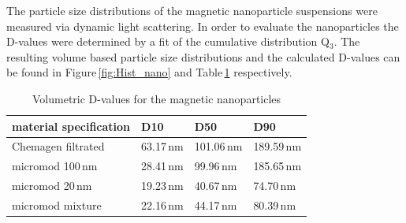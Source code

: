 The particle size distributions of the magnetic nanoparticle suspensions were measured via dynamic light scattering. In order to evaluate the nanoparticles the D-values were determined by a fit of the cumulative distribution Q$_{3}$. The resulting volume based particle size distributions and the calculated D-values can be found in Figure\,\ref{fig:Hist_nano} and Table\,\ref{table:D_values} respectively.

\begin{table}[h]
\centering
\caption[Volumetric D-values for the magnetic nanoparticles]{Volumetric D-values for the magnetic nanoparticles}
\label{table:D_values}
\begin{tabularx}{\textwidth}{XXXX}\hline
material specification & D10  & D50 & D90  \\
\hline\hline
Chemagen filtrated & 63.17\,nm & 101.06\,nm & 189.59\,nm \\
micromod 100\,nm & 28.41\,nm & 99.96\,nm & 185.65\,nm \\
micromod 20\,nm & 19.23\,nm & 40.67\,nm & 74.70\,nm \\
micromod mixture & 22.16\,nm & 44.17\,nm & 80.39\,nm \\
\hline
\end{tabularx}
\end{table}  

